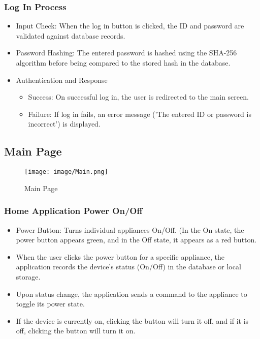 \documentclass[conference]{IEEEtran}
\begin{document}
\subsubsection{Log In Process}
\begin{itemize}
    \item Input Check: When the log in button is clicked, the ID and password are validated against database records.\\
    \item Password Hashing: The entered password is hashed using the SHA-256 algorithm before being compared to the stored hash in the database.\\
    \item Authentication and Response
\begin{itemize}
    \item Success: On successful log in, the user is redirected to the main screen.\\
    \item Failure: If log in fails, an error message ('The entered ID or password is incorrect') is displayed.\\
\end{itemize}
\end{itemize}



\subsection{Main Page}

\begin{figure}[h!]
    \centering
    \texttt{[image: image/Main.png]}
    \caption{Main Page}
    \label{fig:enter-label}
\end{figure}



\subsubsection{Home Application Power On/Off}

\begin{itemize}
    \item Power Button: Turns individual appliances On/Off. (In the On state, the power button appears green, and in the Off state, it appears as a red button.\\
    \item When the user clicks the power button for a specific appliance, the application records the device's status (On/Off) in the database or local storage.\\
    \item Upon status change, the application sends a command to the appliance to toggle its power state.\\
    \item If the device is currently on, clicking the button will turn it off, and if it is off, clicking the button will turn it on.\\
\end{itemize}\\
\end{document}
